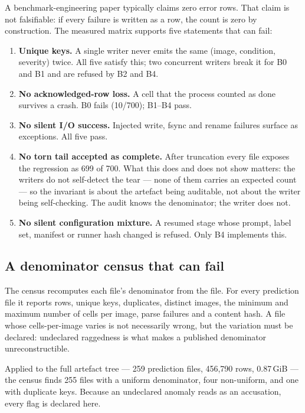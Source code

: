 A benchmark-engineering paper typically claims zero error rows. That claim is not
falsifiable: if every failure is written as a row, the count is zero by
construction. The measured matrix supports five statements that can fail:
\begin{enumerate}[leftmargin=1.4em,itemsep=1pt,topsep=2pt]
\item \textbf{Unique keys.} A single writer never emits the same
(image, condition, severity) twice. All five satisfy this; two concurrent writers
break it for B0 and B1 and are refused by B2 and B4.
\item \textbf{No acknowledged-row loss.} A cell that the process counted as done
survives a crash. B0 fails (10/700); B1--B4 pass.
\item \textbf{No silent I/O success.} Injected write, fsync and rename failures
surface as exceptions. All five pass.
\item \textbf{No torn tail accepted as complete.} After truncation every file
exposes the regression as 699 of 700. What this does and does not show matters:
the writers do not self-detect the tear --- none of them carries an expected
count --- so the invariant is about the artefact being auditable, not about the
writer being self-checking. The audit knows the denominator; the writer does not.
\item \textbf{No silent configuration mixture.} A resumed stage whose prompt,
label set, manifest or runner hash changed is refused. Only B4 implements this.
\end{enumerate}

\subsection{A denominator census that can fail}

The census recomputes each file's denominator from the file. For every prediction
file it reports rows, unique keys, duplicates, distinct images, the minimum and
maximum number of cells per image, parse failures and a content hash. A file whose
cells-per-image varies is not necessarily wrong, but the variation must be
declared: undeclared raggedness is what makes a published denominator
unreconstructible.

Applied to the full artefact tree --- 259 prediction files, 456,790 rows,
0.87\,GiB --- the census finds 255 files with a uniform denominator, four
non-uniform, and one with duplicate keys. Because an undeclared anomaly reads as
an accusation, every flag is declared here.

